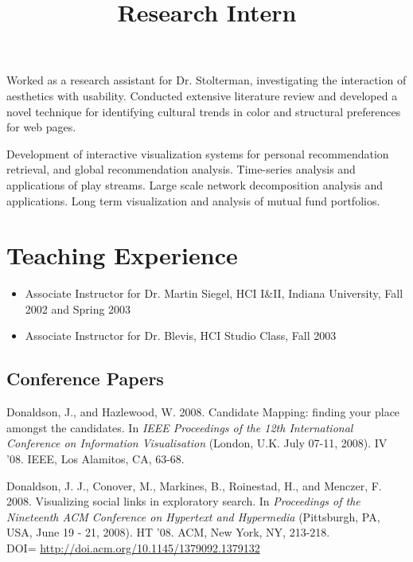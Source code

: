 \documentclass[overlapped,line,letterpaper]{res}
\begin{document}
\begin{resume}
\begin{position}
Worked as a research assistant for Dr. Stolterman, investigating the interaction of aesthetics with usability.  Conducted extensive literature review and developed a novel technique for identifying cultural trends in color and structural preferences for web pages.
\end{position}


\title{Research Intern}
\begin{position}
  Development of interactive visualization systems for personal recommendation retrieval, and global recommendation analysis.  Time-series analysis and applications of play streams.  Large scale network decomposition analysis and applications.  Long term visualization and analysis of mutual fund portfolios.
\end{position}


\section{\bf Teaching Experience}

\begin{itemize}
\item Associate Instructor for Dr. Martin Siegel, HCI I\&II, Indiana University, Fall 2002 and Spring 2003 
\item Associate Instructor for Dr. Blevis, HCI Studio Class, Fall 2003
\end{itemize}


\subsection{\bf Conference Papers}
Donaldson, J., and Hazlewood, W. 2008. Candidate Mapping: finding your place amongst the candidates. In \emph{IEEE Proceedings of the 12th International Conference on Information Visualisation} (London, U.K. July 07-11, 2008). IV '08. IEEE, Los Alamitos, CA, 63-68.

Donaldson, J. J., Conover, M., Markines, B., Roinestad, H., and Menczer, F. 2008. Visualizing social links in exploratory search. In \emph{Proceedings of the Nineteenth ACM Conference on Hypertext and Hypermedia} (Pittsburgh, PA, USA, June 19 - 21, 2008). HT '08. ACM, New York, NY, 213-218. \\ DOI= \url{http://doi.acm.org/10.1145/1379092.1379132} 


\end{resume}
\end{document}
